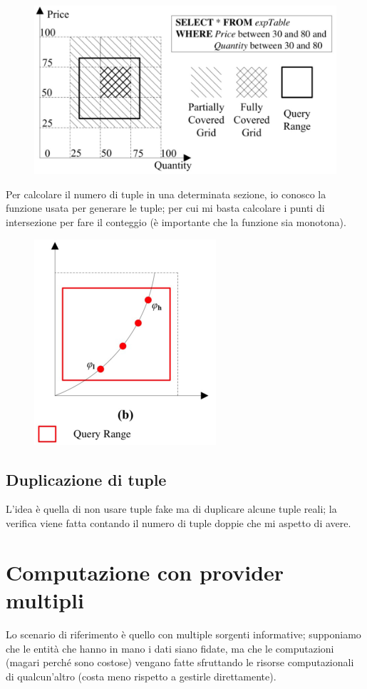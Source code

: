 \documentclass{report}
\begin{document}
\begin{figure}[H]
    \centering
    \includegraphics[width=0.8\linewidth]{images/fake-tuples.png}
\end{figure}

\noindent Per calcolare il numero di tuple in una determinata sezione, io conosco 
la funzione usata per generare le tuple; per cui mi basta calcolare i punti 
di intersezione per fare il conteggio (è importante che la funzione sia monotona).

\begin{figure}[H]
    \centering
    \includegraphics[width=0.4\linewidth]{images/fake-tuples-1.png}
\end{figure}


\subsection{Duplicazione di tuple}
L'idea è quella di non usare tuple fake ma di duplicare alcune tuple reali; la verifica viene 
fatta contando il numero di tuple doppie che mi aspetto di avere. 


\section{Computazione con provider multipli}
Lo scenario di riferimento è quello con multiple sorgenti informative; supponiamo che le 
entità che hanno in mano i dati siano fidate, ma che le computazioni (magari perché sono 
costose) vengano fatte sfruttando le risorse computazionali di qualcun'altro (costa meno 
rispetto a gestirle direttamente).
\end{document}
